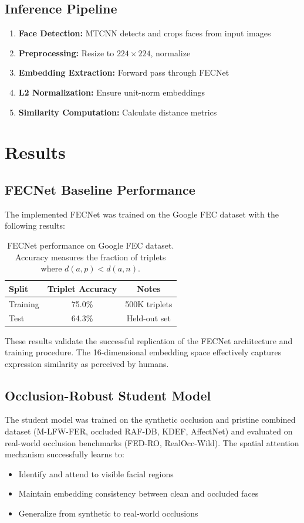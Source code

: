 \documentclass[10pt,twocolumn]{article}
\begin{document}
\subsection{Inference Pipeline}
\begin{enumerate}
    \item \textbf{Face Detection:} MTCNN detects and crops faces from input images
    \item \textbf{Preprocessing:} Resize to $224 \times 224$, normalize
    \item \textbf{Embedding Extraction:} Forward pass through FECNet
    \item \textbf{L2 Normalization:} Ensure unit-norm embeddings
    \item \textbf{Similarity Computation:} Calculate distance metrics
\end{enumerate}

\section{Results}

\subsection{FECNet Baseline Performance}
The implemented FECNet was trained on the Google FEC dataset with the following results:

\begin{table}[H]
\centering
\small
\begin{tabular}{lcc}
\toprule
\textbf{Split} & \textbf{Triplet Accuracy} & \textbf{Notes} \\
\midrule
Training & 75.0\% & 500K triplets \\
Test & 64.3\% & Held-out set \\
\bottomrule
\end{tabular}
\caption{FECNet performance on Google FEC dataset. Accuracy measures the fraction of triplets where $d(a,p) < d(a,n)$.}
\end{table}

These results validate the successful replication of the FECNet architecture and training procedure. The 16-dimensional embedding space effectively captures expression similarity as perceived by humans.

\subsection{Occlusion-Robust Student Model}
The student model was trained on the synthetic occlusion and pristine combined dataset (M-LFW-FER, occluded RAF-DB, KDEF, AffectNet) and evaluated on real-world occlusion benchmarks (FED-RO, RealOcc-Wild). The spatial attention mechanism successfully learns to:
\begin{itemize}
    \item Identify and attend to visible facial regions
    \item Maintain embedding consistency between clean and occluded faces
    \item Generalize from synthetic to real-world occlusions
\end{itemize}
\end{document}
